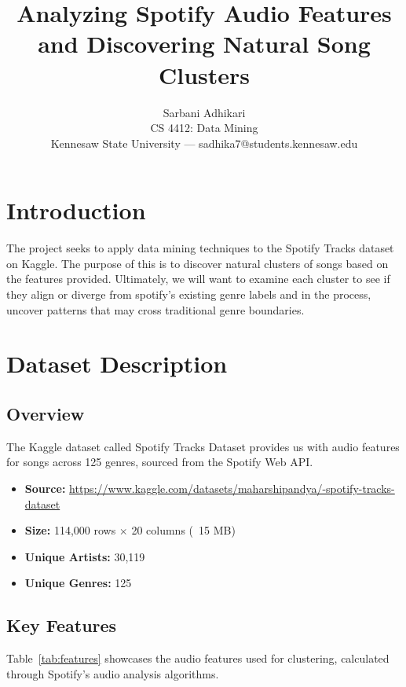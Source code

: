 \documentclass[10pt,twocolumn]{article}
\title{\Large\bfseries Analyzing Spotify Audio Features and Discovering Natural Song Clusters }
\author{Sarbani Adhikari\\
\small CS 4412: Data Mining\\
\small Kennesaw State University --- sadhika7@students.kennesaw.edu}
\date{}
\begin{document}
\maketitle

\section{Introduction}

The project seeks to apply data mining techniques to the Spotify Tracks dataset on Kaggle. The purpose of this is to discover natural clusters of songs based on the features provided. Ultimately, we will want to examine each cluster to see if they align or diverge from spotify's existing genre labels and in the process, uncover patterns that may cross traditional genre boundaries.

\section{Dataset Description}

\subsection{Overview}
The Kaggle dataset called Spotify Tracks Dataset provides us with audio features for songs across 125 genres, sourced from the Spotify Web API.

\begin{itemize}
    \item \textbf{Source:} \url{https://www.kaggle.com/datasets/maharshipandya/-spotify-tracks-dataset}
    \item \textbf{Size:} 114,000 rows $\times$ 20 columns (~15 MB)
    \item \textbf{Unique Artists:} 30,119
    \item \textbf{Unique Genres:} 125
\end{itemize}

\subsection{Key Features}
Table~\ref{tab:features} showcases the audio features used for clustering, calculated through Spotify's audio analysis algorithms.
\end{document}
